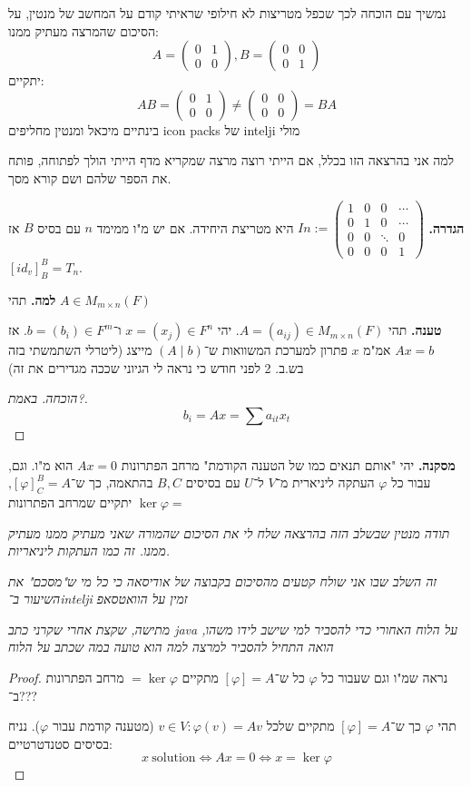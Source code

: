 \documentclass[]{article}
\newcommand\co        {\colon}
\newcommand\pms[1]    {\begin{pmatrix}
		#1
\end{pmatrix}}
\renewcommand\phi     {\varphi}
\begin{document}
	נמשיך עם הוכחה לכך שכפל מטריצות לא חילופי שראיתי קודם על המחשב של מנטין, על הסיכום שהמרצה מעתיק ממנו: 
	\[ A = \pms{0 & 1 \\ 0 & 0}, B = \pms{0 & 0 \\ 0 & 1} \]
	יתקיים: 
	\[ AB = \pms{0 & 1 \\ 0 & 0} \neq \pms{0 & 0 \\ 0 & 0} = BA \]
	בינתיים מיכאל ומנטין מחליפים icon packs של intelji מולי
	
	למה אני בהרצאה הזו בכלל, אם הייתי רוצה מרצה שמקריא מדף הייתי הולך לפתוחה, פותח את הספר שלהם ושם קורא מסך. 
	
	\textbf{הגדרה. }$In := \pms{1 & 0 & 0 & \cdots \\ 0 & 1 & 0 &\cdots \\ 0 & 0 & \ddots & 0 \\ 0 & 0 & 0 & 1}$
	היא מטריצת היחידה. 
	אם יש מ"ו ממימד $n$ עם בסיס $B$ אז $[id_v]^B_B = T_n$.
	
	\textbf{למה. }תהי $A \in M_{m \times n}(F)$ 
	
	\textbf{טענה. }תהי $A = (a_{ij}) \in M_{m \times n}(F)$. יהי $x = (x_j) \in F^n$ ו־$b = (b_i) \in F^m$. אז $Ax = b$ אמ"מ $x$ פתרון למערכת המשוואות ש־$(A \mid b)$ מייצג (ליטרלי השתמשתי בזה בש.ב. 2 לפני חודש כי נראה לי הגיוני שככה מגדירים את זה)
	\begin{proof}[הוכחה. באמת?]
		\[ b_i = Ax = \sum a_{it}x_t \]
	\end{proof}
	
	\textbf{מסקנה. }יהי "אותם תנאים כמו של הטענה הקודמת" מרחב הפתרונות $Ax = 0$ הוא מ"ו. וגם, עבור כל $\phi$ העתקה ליניארית מ־$V$ ל־$U$ עם בסיסים $B, C$ בהתאמה, כך ש־$[\phi]_C^B = A$, יתקיים שמרחב הפתרונות $\ker \phi=$
	
	\textit{תודה מנטין שבשלב הזה בהרצאה שלח לי את הסיכום שהמורה שאני מעתיק ממנו מעתיק ממנו. זה כמו העתקות ליניאריות. }
	
	\textit{זה השלב שבו אני שולח קטעים מהסיכום בקבוצה של אודיסאה כי כל מי ש"מסכם" את השיעור ב־intelji זמין על הוואטסאפ}
	
	\textit{מתישה, שקצת אחרי שקרני כתב java על הלוח האחורי כדי להסביר למי שישב לידו משהו, הואה התחיל להסביר למרצה למה הוא טועה במה שכתב על הלוח}
	
	\begin{proof}
		נראה שמ"ו וגם שעבור כל $\phi$ כל ש־$[\phi] = A$ מתקיים $=\ker\phi$ מרחב הפתרונות ב־???
		
		תהי $\phi$ כך ש־$[\phi] = A$ מתקיים שלכל $v \in V \co \phi(v) = Av$ (מטענה קודמת עבור $\phi$). נניח בסיסים סטנדטרטיים: 
		\[ x \ \mathrm{solution} \iff Ax = 0 \iff x = \ker\phi \]
		
	\end{proof}
	
\end{document}
